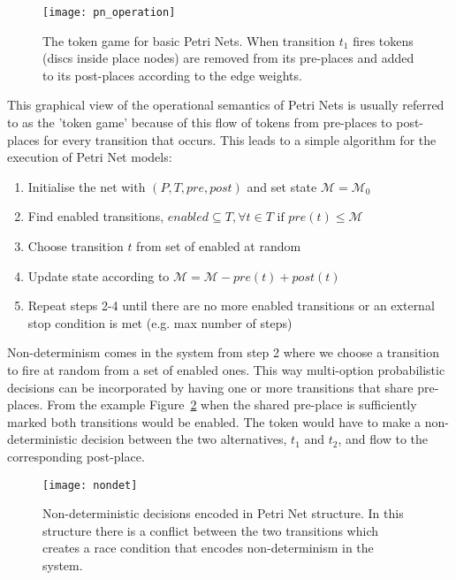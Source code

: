 \begin{figure}
\centering
\texttt{[image: pn\_operation]}
\caption[Token game for basic Petri Nets]{The token game for basic Petri Nets. When transition $t_1$
  fires tokens (discs inside place nodes) are removed from its
  pre-places and added to its post-places according to the edge weights.}
\label{fig:pn_operation}
\end{figure}

This graphical view of the operational semantics of Petri Nets is
usually referred to as the 'token game' because of this flow of tokens
from pre-places to post-places for every transition that occurs. This
leads to a simple algorithm for the execution of Petri Net models:

\begin{enumerate}[noitemsep]
\item Initialise the net  with $(P, T, pre, post)$ and set state $\mathcal{M} = \mathcal{M}_0$
\item Find enabled transitions, $enabled \subseteq T, \forall t \in T \mbox{ if } pre(t) \leq \mathcal{M}$
\item Choose transition $t$ from set of enabled at random
\item Update state according to $\mathcal{M} = \mathcal{M} -pre(t) + post(t)$
\item Repeat steps 2-4 until there are no more enabled transitions or
  an external stop condition is met (e.g. max number of steps)
\end{enumerate}
Non-determinism comes in the system from step 2 where we choose a
transition to fire at random from a set of enabled ones. This way multi-option
probabilistic decisions can be incorporated by having one or more
transitions that share pre-places. From the
example Figure~\ref{fig:nondet} when the shared pre-place is
sufficiently marked both transitions would be enabled. The token would
have to make a non-deterministic decision between the two
alternatives, $t_1$ and $t_2$, and flow to the corresponding
post-place.

\begin{figure}
\centering
\texttt{[image: nondet]}
\caption[Non-determinism in Petri Net structure]{Non-deterministic decisions encoded in Petri Net
  structure. In this structure there is a conflict between the two
  transitions which creates a race condition that encodes
  non-determinism in the system.}
\label{fig:nondet}
\end{figure}

